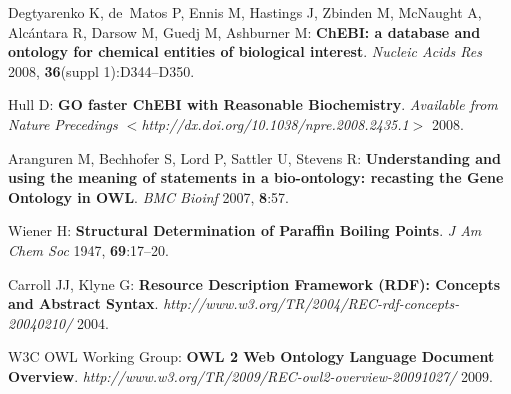 \documentclass[10pt]{bmc_article}
\newenvironment{bmcformat}{\begin{raggedright}\baselineskip20pt\sloppy\setboolean{publ}{false}}{\end{raggedright}\baselineskip20pt\sloppy}
\begin{document}
\begin{bmcformat}
\begin{thebibliography}{10}
Degtyarenko K, de~Matos P, Ennis M, Hastings J, Zbinden M, McNaught A,
  Alc\'{a}ntara R, Darsow M, Guedj M, Ashburner M: \textbf{{ChEBI}: a database
  and ontology for chemical entities of biological interest}. \emph{Nucleic
  Acids Res} 2008, \textbf{36}(suppl 1):D344--D350.

Hull D: \textbf{{GO} faster {ChEBI} with Reasonable Biochemistry}.
  \emph{Available from Nature Precedings
  $<$http://dx.doi.org/10.1038/npre.2008.2435.1$>$} 2008.

Aranguren M, Bechhofer S, Lord P, Sattler U, Stevens R: \textbf{Understanding
  and using the meaning of statements in a bio-ontology: recasting the Gene
  Ontology in {OWL}}. \emph{BMC Bioinf} 2007, \textbf{8}:57.

Wiener H: \textbf{Structural Determination of Paraffin Boiling Points}. \emph{J
  Am Chem Soc} 1947, \textbf{69}:17--20.

Carroll JJ, Klyne G: \textbf{Resource Description Framework ({RDF}): Concepts
  and Abstract Syntax}.
  \emph{http://www.w3.org/TR/2004/REC-rdf-concepts-20040210/} 2004.

{W3C OWL Working Group}: \textbf{{OWL} 2 Web Ontology Language Document
  Overview}. \emph{http://www.w3.org/TR/2009/REC-owl2-overview-20091027/} 2009.

\end{thebibliography}

\newcommand{\BMCxmlcomment}[1]{}

\BMCxmlcomment{

<refgrp>

<bibl id="B1">
  <title><p>Biomedical semantics in the Semantic Web</p></title>
  <aug>
    <au><snm>Splendiani</snm><fnm>A</fnm></au>
    <au><snm>Burger</snm><fnm>A</fnm></au>
    <au><snm>Paschke</snm><fnm>A</fnm></au>
    <au><snm>Romano</snm><fnm>P</fnm></au>
    <au><snm>Marshall</snm><fnm>M.</fnm></au>
  </aug>
  <source>J Biomed Semantics</source>
  <pubdate>2011</pubdate>
  <volume>2</volume>
  <issue>Suppl 1</issue>
  <fpage>S1</fpage>
</bibl>

<bibl id="B2">
  <title><p>Chemical markup, {XML}, and the World Wide Web. 5. Applications of
  chemical metadata in {RSS} aggregators.</p></title>
  <aug>
    <au><snm>Murray Rust</snm><fnm>P.</fnm></au>
    <au><snm>Rzepa</snm><fnm>H. S.</fnm></au>
    <au><snm>Williamson</snm><fnm>M. J.</fnm></au>
    <au><snm>Willighagen</snm><fnm>E. L.</fnm></au>
  </aug>
  <source>J Chem Inf Comput Sci</source>
  <publisher>Unilever Centre for Molecular Informatics, University of
  Cambridge, Cambridge, UK.</publisher>
  <pubdate>2004</pubdate>
  <volume>44</volume>
  <issue>2</issue>
  <fpage>462</fpage>
  <lpage>-469</lpage>
</bibl>

}
\end{bmcformat}
\end{document}
